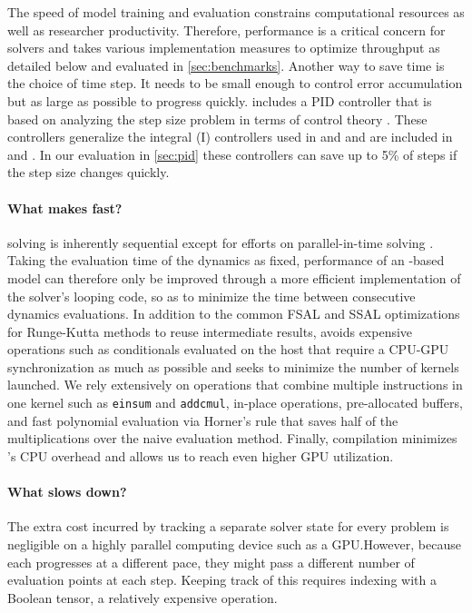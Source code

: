 \documentclass{article}
\newcommand\py[1]{\texttt{#1}}
\begin{document}
The speed of model training and evaluation constrains computational resources as well as researcher productivity. Therefore, performance is a critical concern for \ODE{} solvers and \torchode{} takes various implementation measures to optimize throughput as detailed below and evaluated in \cref{sec:benchmarks}. Another way to save time is the choice of time step. It needs to be small enough to control error accumulation but as large as possible to progress quickly. \torchode{} includes a PID controller that is based on analyzing the step size problem in terms of control theory \citep{soderlind2002automatic,soderlind2003digital}. These controllers generalize the integral (I) controllers used in \torchdiffeq{} and \torchdyn{} and are included in \diffeq{} and \diffrax{}. In our evaluation in \cref{sec:pid} these controllers can save up to 5\% of steps if the step size changes quickly.

\paragraph{What makes \torchode{} fast?} \ODE{} solving is inherently sequential except for efforts on parallel-in-time solving \citep{gander201550}. Taking the evaluation time of the dynamics as fixed, performance of an \ODE{}-based model can therefore only be improved through a more efficient implementation of the solver's looping code, so as to minimize the time between consecutive dynamics evaluations. In addition to the common FSAL and SSAL optimizations for Runge-Kutta methods to reuse intermediate results, \torchode{} avoids expensive operations such as conditionals evaluated on the host that require a CPU-GPU synchronization as much as possible and seeks to minimize the number of \pytorch{} kernels launched. We rely extensively on operations that combine multiple instructions in one kernel such as \py{einsum} and \py{addcmul}, in-place operations, pre-allocated buffers, and fast polynomial evaluation via Horner's rule that saves half of the multiplications over the naive evaluation method. Finally, \jit{} compilation minimizes \python{}'s CPU overhead and allows us to reach even higher GPU utilization.

\paragraph{What slows \torchode{} down?} The extra cost incurred by tracking a separate solver state for every problem is negligible on a highly parallel computing device such as a GPU.\@ However, because each \ODE{} progresses at a different pace, they might pass a different number of evaluation points at each step. Keeping track of this requires indexing with a Boolean tensor, a relatively expensive operation.
\end{document}
